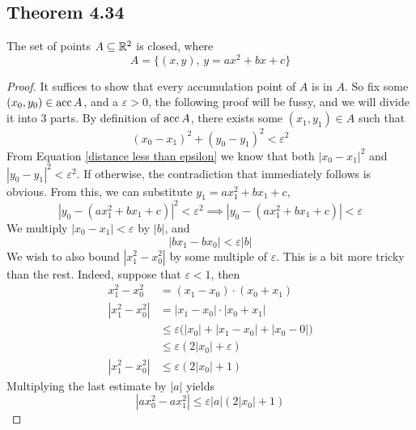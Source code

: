 \documentclass[../../main.tex]{subfiles}
\begin{document}
\subsection{Theorem 4.34}
\begin{wts}
The set of points $A\subseteq\mathbb{R}^2$ is closed, where
\[
A = \{(x,y),\, y=ax^2 + bx + c\}
\]
\end{wts}
\begin{proof}
    It suffices to show that every accumulation point of $A$ is in $A$. So fix some $(x_0,y_0)\in \operatorname{acc}{A}$, and a $\varepsilon>0$, the following proof will be fussy, and we will divide it into 3 parts. By definition of $\operatorname{acc}{A}$, there exists some $(x_1,y_1)\in A$ such that
    \begin{equation}\label{distance less than epsilon}
        (x_0-x_1)^2 + (y_0-y_1)^2<\varepsilon^2
    \end{equation}
    From Equation \eqref{distance less than epsilon} we know that both $|x_0-x_1|^2$ and $|y_0-y_1|^2<\varepsilon^2$. If otherwise, the contradiction that immediately follows is obvious. From this, we can substitute $y_1 = ax^2_1 + bx_1 + c$, 
    \begin{equation}\label{y1 equation}
    \left|y_0 - (ax_1^2 + bx_1 + c)\right|^2<\varepsilon^2\implies \left|y_0 - (ax_1^2 + bx_1 + c)\right|<\varepsilon
    \end{equation}
    We multiply $|x_0 - x_1|<\varepsilon$ by $|b|$, and
    \begin{equation}\label{x1 b equation}
    |bx_1-bx_0|<\varepsilon|b|
    \end{equation}
    We wish to also bound $|x_1^2-x_0^2|$ by some multiple of $\varepsilon$. This is a bit more tricky than the rest. Indeed, suppose that $\varepsilon<1$, then
    \begin{align*}
        x_1^2 - x_0^2&=(x_1-x_0)\cdot(x_0+x_1)\\[1ex]
        |x_1^2 - x_0^2|&=|x_1-x_0|\cdot|x_0+x_1|\\[1ex]
        &\leq \varepsilon\biggl(|x_0| + |x_1-x_0|+|x_0-0|\biggr)\\[1ex]
        &\leq \varepsilon(2|x_0|+\varepsilon)\\[1ex]
        |x_1^2-x_0^2|&\leq \varepsilon(2|x_0|+1)
    \end{align*}
    Multiplying the last estimate by $|a|$ yields
    \begin{equation}\label{x1 a equation}
    |ax_0^2 - ax_1^2|\leq \varepsilon |a|(2|x_0|+1)
    \end{equation}

\end{proof}
\end{document}
